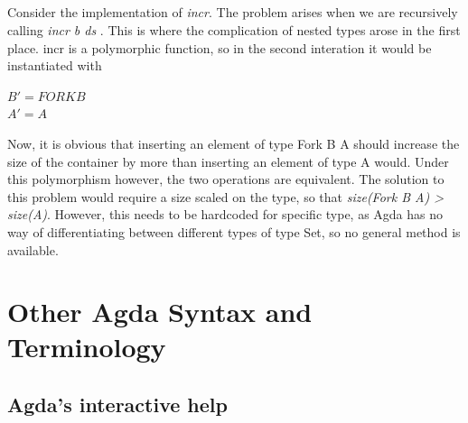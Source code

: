 \documentclass[12pt,twoside,notitlepage]{report}
\begin{document}
\begin{code}
\\
\>[0]\<[4]%
\>[4]   \AgdaSymbol{=}   \<%
\\
\>[0]\<[4]%
\>[4]  \AgdaSymbol{(}  \AgdaSymbol{)} \AgdaSymbol{=}  \AgdaSymbol{(}  \AgdaSymbol{)} \<%
\\
\>[0]\<[4]%
\>[4]  \AgdaSymbol{(}  \AgdaSymbol{)} \AgdaSymbol{=} \AgdaSymbol{\{!   !\}} \<[34]%
\>[34]\<%
\\
\end{code}


Consider the implementation of \textit{incr}. The problem arises when we are recursively calling \textit{incr b ds} . This is where the complication of nested types arose in the first place. incr is a polymorphic function, so in the second interation it would be instantiated with 
\begin{center}
$ B' = FORK B$ \\
$ A' = A $ \\
\end{center}
Now, it is obvious that inserting an element of type Fork B A should increase the size of the container by more than inserting an element of type A would. Under this polymorphism however, the two operations are equivalent.
The solution to this problem would require a size scaled on the type, so that\textit{ size(Fork B A) > size(A)}. However, this needs to be hardcoded for specific type, as Agda has no way of differentiating between different types of type Set, so no general method is available.

\section{Other Agda Syntax and Terminology}

\subsection{Agda's interactive help}
\end{document}
